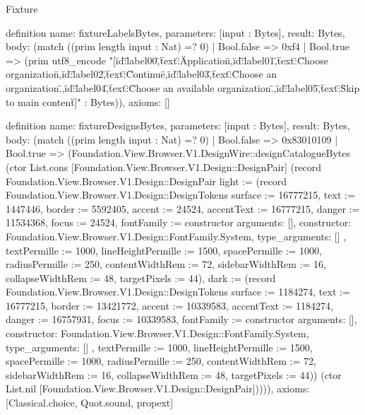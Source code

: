 \begin{lexlean}{Fixture}
\begin{semanticmodule}
definition{
  name: fixtureLabelsBytes,
  parameters: [input : Bytes],
  result: Bytes,
  body: (match ((prim length input : Nat) =? 0)
    | Bool.false => 0xf4
    | Bool.true => (prim utf8_encode "[{\"id\":\"label00\",\"text\":\"Application\"},{\"id\":\"label01\",\"text\":\"Choose organization\"},{\"id\":\"label02\",\"text\":\"Continue\"},{\"id\":\"label03\",\"text\":\"Choose an organization.\"},{\"id\":\"label04\",\"text\":\"Choose an available organization.\"},{\"id\":\"label05\",\"text\":\"Skip to main content\"}]" : Bytes)),
  axioms: []
}

definition{
  name: fixtureDesignsBytes,
  parameters: [input : Bytes],
  result: Bytes,
  body: (match ((prim length input : Nat) =? 0)
    | Bool.false => 0x83010109
    | Bool.true => (Foundation.View.Browser.V1.DesignWire::designCatalogueBytes (ctor List.cons [Foundation.View.Browser.V1.Design::DesignPair] (record Foundation.View.Browser.V1.Design::DesignPair {light := (record Foundation.View.Browser.V1.Design::DesignTokens {surface := 16777215, text := 1447446, border := 5592405, accent := 24524, accentText := 16777215, danger := 11534368, focus := 24524, fontFamily := constructor{
      arguments: [],
      constructor: Foundation.View.Browser.V1.Design::FontFamily.System,
      type_arguments: []
    }, textPermille := 1000, lineHeightPermille := 1500, spacePermille := 1000, radiusPermille := 250, contentWidthRem := 72, sidebarWidthRem := 16, collapseWidthRem := 48, targetPixels := 44}), dark := (record Foundation.View.Browser.V1.Design::DesignTokens {surface := 1184274, text := 16777215, border := 13421772, accent := 10339583, accentText := 1184274, danger := 16757931, focus := 10339583, fontFamily := constructor{
      arguments: [],
      constructor: Foundation.View.Browser.V1.Design::FontFamily.System,
      type_arguments: []
    }, textPermille := 1000, lineHeightPermille := 1500, spacePermille := 1000, radiusPermille := 250, contentWidthRem := 72, sidebarWidthRem := 16, collapseWidthRem := 48, targetPixels := 44})}) (ctor List.nil [Foundation.View.Browser.V1.Design::DesignPair])))),
  axioms: [Classical.choice, Quot.sound, propext]
}


\end{semanticmodule}
\end{lexlean}
